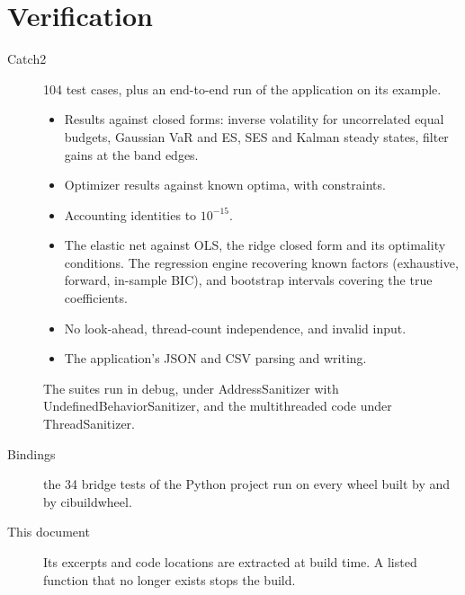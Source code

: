 \documentclass[11pt,a4paper]{article}
\begin{document}
\section{Verification}\label{sec:verification}
\begin{description}
  \item[Catch2] 104 test cases, plus an end-to-end run of the application on its example.
        \begin{itemize}
          \item Results against closed forms: inverse volatility for uncorrelated equal
                budgets, Gaussian VaR and ES, SES and Kalman steady states, filter gains at
                the band edges.
          \item Optimizer results against known optima, with constraints.
          \item Accounting identities to $10^{-15}$.
          \item The elastic net against OLS, the ridge closed form and its optimality
                conditions. The regression engine recovering known factors (exhaustive,
                forward, in-sample BIC), and bootstrap intervals covering the true
                coefficients.
          \item No look-ahead, thread-count independence, and invalid input.
          \item The application's JSON and CSV parsing and writing.
        \end{itemize}
        The suites run in debug, under AddressSanitizer with UndefinedBehaviorSanitizer,
        and the multithreaded code under ThreadSanitizer.
  \item[Bindings] the 34 bridge tests of the Python project run on every wheel built by
         and by cibuildwheel.
  \item[This document] Its excerpts and code locations are extracted at build time. A listed
        function that no longer exists stops the build.
\end{description}
\end{document}
